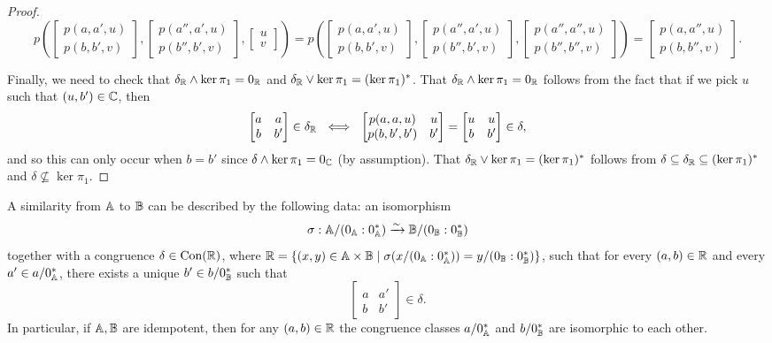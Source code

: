 \documentclass[letterpaper,11pt]{article}
\DeclareMathOperator{\Con}{Con}
\begin{document}
\begin{proof}
\[
p\left(\begin{bmatrix} p(a,a',u)\\ p(b,b',v)\end{bmatrix}, \begin{bmatrix} p(a'',a',u)\\ p(b'',b',v)\end{bmatrix}, \begin{bmatrix} u\\ v\end{bmatrix}\right) = p\left(\begin{bmatrix} p(a,a',u)\\ p(b,b',v)\end{bmatrix}, \begin{bmatrix} p(a'',a',u)\\ p(b'',b',v)\end{bmatrix}, \begin{bmatrix} p(a'',a'',u)\\ p(b'',b'',v)\end{bmatrix}\right) = \begin{bmatrix} p(a,a'',u)\\ p(b,b'',v)\end{bmatrix}.
\]

Finally, we need to check that $\delta_{\mathbb{R}} \wedge \ker \pi_1 = 0_{\mathbb{R}}$ and $\delta_{\mathbb{R}} \vee \ker \pi_1 = (\ker \pi_1)^*$. That $\delta_{\mathbb{R}} \wedge \ker \pi_1 = 0_{\mathbb{R}}$ follows from the fact that if we pick $u$ such that $(u,b') \in \mathbb{C}$, then
\[
\begin{bmatrix} a & a\\ b & b'\end{bmatrix} \in \delta_{\mathbb{R}}\ \iff\ \begin{bmatrix} p(a,a,u) & u\\ p(b,b',b') & b'\end{bmatrix} = \begin{bmatrix} u & u\\ b & b'\end{bmatrix} \in \delta,
\]
and so this can only occur when $b = b'$ since $\delta \wedge \ker \pi_1 = 0_{\mathbb{C}}$ (by assumption). That $\delta_{\mathbb{R}} \vee \ker \pi_1 = (\ker \pi_1)^*$ follows from $\delta \subseteq \delta_{\mathbb{R}} \subseteq (\ker \pi_1)^*$ and $\delta \not\subseteq \ker \pi_1$.
\end{proof}

\begin{cor}\label{similar-detail} A similarity from $\mathbb{A}$ to $\mathbb{B}$ can be described by the following data: an isomorphism
\[
\sigma: \mathbb{A}/(0_{\mathbb{A}}:0_{\mathbb{A}}^*) \xrightarrow{\sim} \mathbb{B}/(0_{\mathbb{B}}:0_{\mathbb{B}}^*)
\]
together with a congruence $\delta \in \Con(\RR)$, where $\mathbb{R} = \{(x,y) \in \mathbb{A} \times \mathbb{B} \mid \sigma(x/(0_{\mathbb{A}}:0_{\mathbb{A}}^*)) = y/(0_{\mathbb{B}}:0_{\mathbb{B}}^*)\}$, such that for every $(a,b) \in \mathbb{R}$ and every $a' \in a/0_{\mathbb{A}}^*$, there exists a unique $b' \in b/0_{\mathbb{B}}^*$ such that
\[
\begin{bmatrix} a & a'\\ b & b'\end{bmatrix} \in \delta.
\]
In particular, if $\mathbb{A}, \mathbb{B}$ are idempotent, then for any $(a,b) \in \mathbb{R}$ the congruence classes $a/0_{\mathbb{A}}^*$ and $b/0_{\mathbb{B}}^*$ are isomorphic to each other.
\end{cor}
\end{document}

